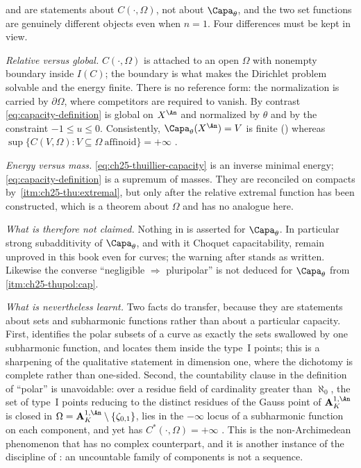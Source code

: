 \begin{remark}
\label{rem:ch25-thuillier-vs-bfj}
 and  are
statements about \(C(\cdot,\Omega)\), not about \(\Capa_\theta\), and the two
set functions are genuinely different objects even when \(n=1\).  Four
differences must be kept in view.

\emph{Relative versus global.}  \(C(\cdot,\Omega)\) is attached to an open
\(\Omega\) with nonempty boundary inside \(I(C)\); the boundary is what
makes the Dirichlet problem solvable and the energy finite.  There is no
reference form: the normalization is carried by \(\partial\Omega\), where
competitors are required to vanish.  By contrast
\eqref{eq:capacity-definition} is global on \(X^{\An}\) and normalized by
\(\theta\) and by the constraint \(-1\leq u\leq0\).  Consistently,
\(\Capa_\theta(X^{\An})=V\) is finite
() whereas
\(\sup\{C(V,\Omega):V\subseteq\Omega\ \text{affinoid}\}=+\infty\)
\cite[Lemme~3.6.28]{Thu05}.

\emph{Energy versus mass.}  \eqref{eq:ch25-thuillier-capacity} is an
inverse minimal energy; \eqref{eq:capacity-definition} is a supremum of
masses.  They are reconciled on compacts by
\,\cref{itm:ch25-thu:extremal}, but only
after the relative extremal function has been constructed, which is a
theorem about \(\Omega\) and has no analogue here.

\emph{What is therefore not claimed.}  Nothing in
 is asserted for \(\Capa_\theta\).  In
particular strong subadditivity of \(\Capa_\theta\), and with it Choquet
capacitability, remain unproved in this book even for curves; the warning
after  stands as written.  Likewise the
converse ``negligible \(\Rightarrow\) pluripolar'' is not deduced for
\(\Capa_\theta\) from
\,\cref{itm:ch25-thupol:cap}.

\emph{What is nevertheless learnt.}  Two facts do transfer, because they are
statements about sets and subharmonic functions rather than about a
particular capacity.  First,
 identifies the polar subsets of a curve as
exactly the sets swallowed by one subharmonic function, and locates them
inside the type~\(\mathrm{I}\) points; this is a sharpening of the
qualitative statement  in dimension
one, where the dichotomy is complete rather than one-sided.  Second, the
countability clause in the definition of ``polar'' is unavoidable: over a
residue field of cardinality greater than \(\aleph_0\), the set of type~I
points reducing to the distinct residues of the Gauss point of
\(\mathbf A^{1,\An}_K\) is closed in
\(\Omega=\mathbf A^{1,\An}_K\setminus\{\zeta_{0,1}\}\), lies in the
\(-\infty\) locus of a subharmonic function on each component, and yet has
\(C^*(\cdot,\Omega)=+\infty\) \cite[Remarque~3.6.12]{Thu05}.  This is the
non-Archimedean phenomenon that has no complex counterpart, and it is
another instance of the discipline of : an uncountable
family of components is not a sequence.
\end{remark}

